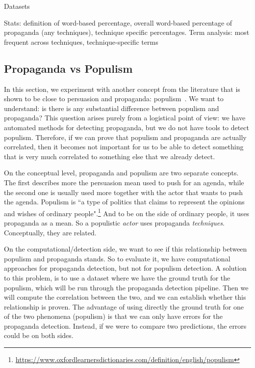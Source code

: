 Datasets

Stats: definition of word-based percentage, overall word-based percentage of propaganda (any techniques), technique specific percentages. Term analysis: most frequent across techniques, technique-specific terms


\subsection{\statusgreen Propaganda vs Populism}
\label{ssec:lp_techniques_populism_vs_propaganda}

In this section, we experiment with another concept from the literature that is shown to be close to persuasion and propaganda: \gls{populism}~\citep{tumber2021routledge,pasquino2008populism}.
We want to understand: is there is any substantial difference between populism and propaganda?
This question arises purely from a logistical point of view: we have automated methods for detecting propaganda, but we do not have tools to detect populism. Therefore, if we can prove that populism and propaganda are actually correlated, then it becomes not important for us to be able to detect something that is very much correlated to something else that we already detect.

On the conceptual level, propaganda and populism are two separate concepts. The first describes more the persuasion mean used to push for an agenda, while the second one is usually used more together with the actor that wants to push the agenda. Populism is ``a type of politics that claims to represent the opinions and wishes of ordinary people".\footnote{\url{https://www.oxfordlearnersdictionaries.com/definition/english/populism}}
And to be on the side of ordinary people, it uses propaganda as a mean. So a populistic \emph{actor} uses propaganda \emph{techniques}. Conceptually, they are related.



On the computational/detection side, we want to see if this relationship between populism and propaganda stands.
So to evaluate it, we have computational approaches for propaganda detection, but not for populism detection.
A solution to this problem, is to use a dataset where we have the ground truth for the populism, which will be run through the propaganda detection pipeline. Then we will compute the correlation between the two, and we can establish whether this relationship is proven. The advantage of using directly the ground truth for one of the two phenomena (populism) is that we can only have errors for the propaganda detection. Instead, if we were to compare two predictions, the errors could be on both sides.

